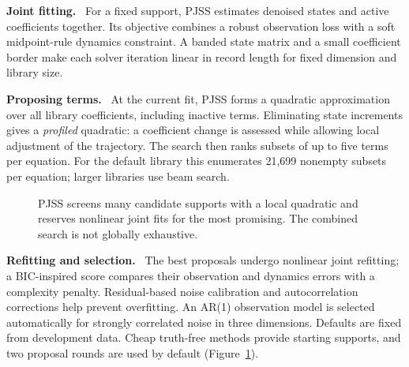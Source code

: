 \documentclass[letterpaper,10pt,twocolumn]{article}
\newcommand{\lead}[1]{\par\smallskip\noindent\textbf{#1}\ }
\begin{document}
\lead{Joint fitting.} For a fixed support, PJSS estimates denoised states and active coefficients together. Its objective combines a robust observation loss with a soft midpoint-rule dynamics constraint. A banded state matrix and a small coefficient border make each solver iteration linear in record length for fixed dimension and library size.

\lead{Proposing terms.} At the current fit, PJSS forms a quadratic approximation over all library coefficients, including inactive terms. Eliminating state increments gives a \emph{profiled} quadratic: a coefficient change is assessed while allowing local adjustment of the trajectory. The search then ranks subsets of up to five terms per equation. For the default library this enumerates 21,699 nonempty subsets per equation; larger libraries use beam search.

\begin{figure}[t]
\centering
{}
\caption{PJSS screens many candidate supports with a local quadratic and reserves nonlinear joint fits for the most promising. The combined search is not globally exhaustive.}
\label{fig:method}
\end{figure}

\lead{Refitting and selection.} The best proposals undergo nonlinear joint refitting; a BIC-inspired score compares their observation and dynamics errors with a complexity penalty. Residual-based noise calibration and autocorrelation corrections help prevent overfitting. An AR(1) observation model is selected automatically for strongly correlated noise in three dimensions. Defaults are fixed from development data. Cheap truth-free methods provide starting supports, and two proposal rounds are used by default (Figure~\ref{fig:method}).
\end{document}
